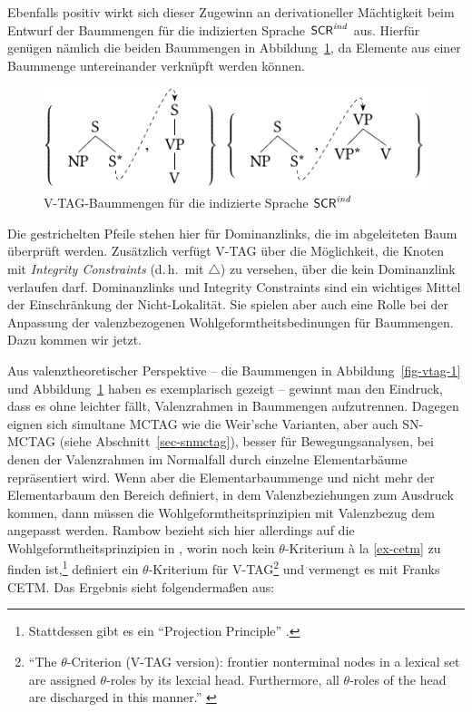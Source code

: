 Ebenfalls positiv wirkt sich dieser Zugewinn an derivationeller Mächtigkeit beim Entwurf der Baummengen für die indizierten Sprache $\mathsf{SCR}^{\mathit{ind}}$ aus. Hierfür genügen nämlich die beiden Baummengen in Abbildung~\ref{fig-vtag-2}, da Elemente aus einer Baummenge untereinander verknüpft werden können.  
\begin{figure}[t]
\centering
\includegraphics{graphics/abb67.pdf}
\caption{V-TAG-Baummengen für die indizierte Sprache $\mathsf{SCR}^{\mathit{ind}}$\label{fig-vtag-2}}
\end{figure}
Die gestrichelten Pfeile stehen hier für Dominanzlinks, die im abgeleiteten Baum überprüft werden. Zusätzlich verfügt V-TAG über die Möglichkeit, die Knoten mit {\it Integrity Constraints} (d.\,h.\ mit $\bigtriangleup$) zu versehen, über die kein Dominanzlink verlaufen darf. Dominanzlinks und Integrity Constraints sind ein wichtiges Mittel der Einschränkung der Nicht-Lokalität. Sie spielen aber auch eine Rolle bei der Anpassung der valenzbezogenen Wohlgeformtheitsbedinungen für Baummengen. Dazu kommen wir jetzt. 

Aus valenztheoretischer Perspektive -- die Baummengen in Abbildung~\ref{fig-vtag-1} und Abbildung~\ref{fig-vtag-2} haben es exemplarisch gezeigt -- gewinnt man den Eindruck, dass es ohne  leichter fällt, Valenzrahmen in Baummengen aufzutrennen. Dagegen eignen sich simultane MCTAG wie die Weir'sche Varianten, aber auch SN-MCTAG (siehe Abschnitt~\ref{sec-snmctag}), besser für Bewegungsanalysen, bei denen der Valenzrahmen im Normalfall durch einzelne Elementarbäume repräsentiert wird. Wenn aber die Elementarbaummenge und nicht mehr der Elementarbaum den Bereich definiert, in dem Valenzbeziehungen zum Ausdruck kommen, dann müssen die Wohlgeformtheitsprinzipien mit Valenzbezug dem angepasst werden. Rambow bezieht sich hier allerdings auf die Wohlgeformtheitsprinzipien in \cite{Frank:92}, worin noch kein $\theta$-Kriterium \`a la \ref{ex-cetm} zu finden ist,\footnote{Stattdessen gibt es ein "`Projection Principle"' \citep[56]{Frank:92}.} definiert ein $\theta$-Kriterium für V-TAG\footnote{"`The $\theta$-Criterion (V-TAG version): frontier nonterminal nodes in a lexical set are assigned $\theta$-roles by its lexcial head. Furthermore, all $\theta$-roles of the head are discharged in this manner."' \citep[148]{Rambow:94}} und vermengt es mit Franks CETM. Das Ergebnis sieht folgenderma\ss en aus:
    
